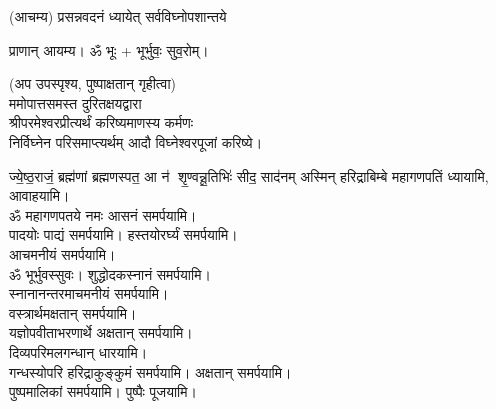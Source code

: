 
\setlength{\parindent}{0pt}


(आचम्य)
{प्रसन्नवदनं ध्यायेत् सर्वविघ्नोपशान्तये}
 
प्राणान्  आयम्य।  ॐ भूः + भूर्भुवः॒ सुव॒रोम्।

(अप उपस्पृश्य, पुष्पाक्षतान् गृहीत्वा)\\
ममोपात्तसमस्त दुरितक्षयद्वारा \\
श्रीपरमेश्वरप्रीत्यर्थं करिष्यमाणस्य कर्मणः\\
 निर्विघ्नेन परिसमाप्त्यर्थम् आदौ विघ्नेश्वरपूजां करिष्ये।

{ज्ये॒ष्ठ॒राजं॒ ब्रह्म॑णां ब्रह्मणस्पत॒ आ न॑ शृ॒ण्वन्नू॒तिभिः॑ सीद॒ साद॑नम्}
अस्मिन् हरिद्राबिम्बे महागणपतिं ध्यायामि, आवाहयामि।\\


ॐ महागणपतये नमः  आसनं समर्पयामि।\\
पादयोः पाद्यं समर्पयामि। हस्तयोरर्घ्यं समर्पयामि।\\
आचमनीयं समर्पयामि।\\
ॐ भूर्भुवस्सुवः। शुद्धोदकस्नानं समर्पयामि।\\
स्नानानन्तरमाचमनीयं समर्पयामि।\\
वस्त्रार्थमक्षतान् समर्पयामि।\\
यज्ञोपवीताभरणार्थे अक्षतान् समर्पयामि।\\
दिव्यपरिमलगन्धान् धारयामि।\\
गन्धस्योपरि हरिद्राकुङ्कुमं समर्पयामि। अक्षतान् समर्पयामि। \\
पुष्पमालिकां समर्पयामि। पुष्पैः पूजयामि।

